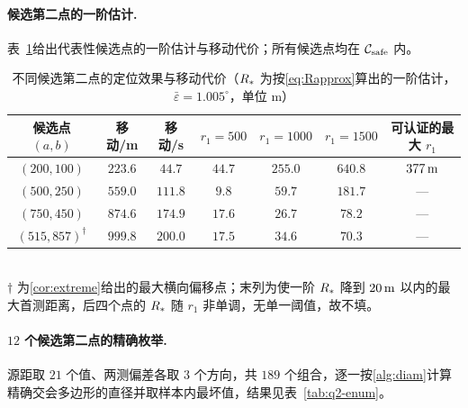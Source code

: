 \begin{appendices}
\paragraph{候选第二点的一阶估计.} 表~\ref{tab:q2-need}给出代表性候选点的一阶估计与移动代价；所有候选点均在 $\mathcal C_{\rm safe}$ 内。

\begin{table}[!htbp]
  \caption{不同候选第二点的定位效果与移动代价（$R_{*}$ 为按\cref{eq:Rapprox}算出的一阶估计，$\bar\varepsilon=1.005^\circ$，单位 m）}\label{tab:q2-need}\centering\small
  \begin{tabular}{ccccccc}
    \toprule[1.5pt]
    候选点 $(a,b)$ & 移动/m & 移动/s & $r_1=500$ & $r_1=1000$ & $r_1=1500$ & 可认证的最大 $r_1$ \\
    \midrule[1pt]
    $(200,100)$ & $223.6$ & $44.7$ & $44.7$ & $255.0$ & $640.8$ & $377\,\mathrm{m}$ \\
    $(500,250)$ & $559.0$ & $111.8$& $9.8$  & $59.7$  & $181.7$ & --- \\
    $(750,450)$ & $874.6$ & $174.9$& $17.6$ & $26.7$  & $78.2$  & --- \\
    $(515,857)^{\dagger}$ & $999.8$ & $200.0$& $17.5$ & $34.6$  & $70.3$ & --- \\
    \bottomrule[1.5pt]
  \end{tabular}\\[2pt]
  \small $\dagger$ 为\cref{cor:extreme}给出的最大横向偏移点；末列为使一阶 $R_{*}$ 降到 $20\,\mathrm{m}$ 以内的最大首测距离，后四个点的 $R_{*}$ 随 $r_1$ 非单调，无单一阈值，故不填。
\end{table}

\paragraph{$12$ 个候选第二点的精确枚举.} 源距取 $21$ 个值、两测偏差各取 $3$ 个方向，共 $189$ 个组合，逐一按\cref{alg:diam}计算精确交会多边形的直径并取样本内最坏值，结果见表~\ref{tab:q2-enum}。


\end{appendices}
